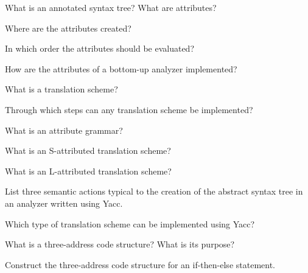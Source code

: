 \begin{Exercise}
What is an annotated syntax tree? What are attributes?
\end{Exercise}

\begin{Exercise}
Where are the attributes created?
\end{Exercise}

\begin{Exercise}
In which order the attributes should be evaluated?
\end{Exercise}

\begin{Exercise}
How are the attributes of a bottom-up analyzer implemented?
\end{Exercise}

\begin{Exercise}
What is a translation scheme?
\end{Exercise}

\begin{Exercise}
Through which steps can any translation scheme be implemented?
\end{Exercise}

\begin{Exercise}
What is an attribute grammar?
\end{Exercise}

\begin{Exercise}
What is an S-attributed translation scheme?
\end{Exercise}

\begin{Exercise}
What is an L-attributed translation scheme?
\end{Exercise}

\begin{Exercise}
List three semantic actions typical to the creation of the abstract syntax tree in an analyzer written using Yacc.
\end{Exercise}

\begin{Exercise}
Which type of translation scheme can be implemented using Yacc?
\end{Exercise}

\begin{Exercise}
What is a three-address code structure? What is its purpose?
\end{Exercise}

\begin{Exercise}
Construct the three-address code structure for an if-then-else statement.
\end{Exercise}

